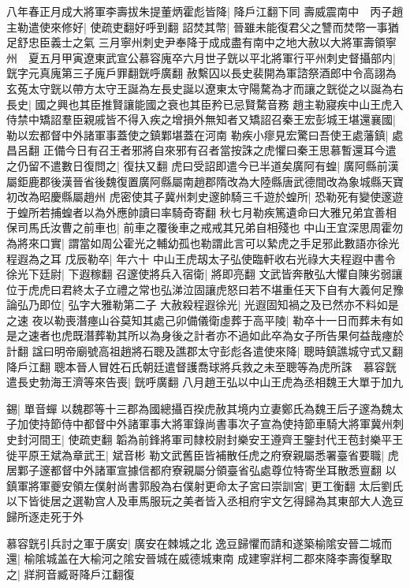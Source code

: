 八年春正月成大將軍李壽拔朱提董炳霍彪皆降|{
	降戶江翻下同}
壽威震南中　丙子趙主勒遣使來修好|{
	使疏吏翻好呼到翻}
詔焚其幣|{
	晉雖未能復君父之讐而焚幣一事猶足舒忠臣義士之氣}
三月寧州刺史尹奉降于成成盡有南中之地大赦以大將軍壽領寧州　夏五月甲寅遼東武宣公慕容廆卒六月世子皝以平北將軍行平州刺史督攝部内|{
	皝字元真廆第三子廆戶罪翻皝呼廣翻}
赦繫囚以長史裴開為軍諮祭酒郎中令高詡為玄菟太守皝以帶方太守王誕為左長史誕以遼東太守陽騖為才而讓之皝從之以誕為右長史|{
	國之興也其臣推賢讓能國之衰也其臣矜已忌賢騖音務}
趙主勒寢疾中山王虎入侍禁中矯詔羣臣親戚皆不得入疾之增損外無知者又矯詔召秦王宏彭城王堪還襄國|{
	勒以宏都督中外諸軍事蓋使之鎮鄴堪蓋在河南}
勒疾小瘳見宏驚曰吾使王處藩鎮|{
	處昌呂翻}
正備今日有召王者邪將自來邪有召者當按誅之虎懼曰秦王思慕暫還耳今遣之仍留不遣數日復問之|{
	復扶又翻}
虎曰受詔即遣今已半道矣廣阿有蝗|{
	廣阿縣前漢屬鉅鹿郡後漢晉省後魏復置廣阿縣屬南趙郡隋改為大陸縣唐武德間改為象城縣天寶初改為昭慶縣屬趙州}
虎密使其子冀州刺史邃帥騎三千遊於蝗所|{
	恐勒死有變使邃遊于蝗所若捕蝗者以為外應帥讀曰率騎奇寄翻}
秋七月勒疾篤遺命曰大雅兄弟宜善相保司馬氏汝曹之前車也|{
	前車之覆後車之戒戒其兄弟自相殘也}
中山王宜深思周霍勿為將來口實|{
	謂當如周公霍光之輔幼孤也勒謂此言可以縶虎之手足邪此數語亦徐光程遐為之耳}
戊辰勒卒|{
	年六十}
中山王虎刼太子弘使臨軒收右光祿大夫程遐中書令徐光下廷尉|{
	下遐稼翻}
召邃使將兵入宿衛|{
	將即亮翻}
文武皆奔散弘大懼自陳劣弱讓位于虎虎曰君終太子立禮之常也弘涕泣固讓虎怒曰若不堪重任天下自有大義何足豫論弘乃即位|{
	弘字大雅勒第二子}
大赦殺程遐徐光|{
	光遐固知禍之及已然亦不料如是之速}
夜以勒喪潛瘞山谷莫知其處己卯備儀衛虛葬于高平陵|{
	勒卒十一日而葬未有如是之速者也虎既潛葬勒其所以為身後之計者亦不過如此卒為女子所告果何益哉瘞於計翻}
諡曰明帝廟號高祖趙將石聰及譙郡太守彭彪各遣使來降|{
	聰時鎮譙城守式又翻降戶江翻}
聰本晉人冒姓石氏朝廷遣督護喬球將兵救之未至聰等為虎所誅　慕容皝遣長史勃海王濟等來告喪|{
	皝呼廣翻}
八月趙王弘以中山王虎為丞相魏王大單于加九

錫|{
	單音蟬}
以魏郡等十三郡為國總攝百揆虎赦其境内立妻鄭氏為魏王后子邃為魏太子加使持節侍中都督中外諸軍事大將軍錄尚書事次子宣為使持節車騎大將軍冀州刺史封河間王|{
	使疏吏翻}
韜為前鋒將軍司隸校尉封樂安王遵齊王鑒封代王苞封樂平王徙平原王斌為章武王|{
	斌音彬}
勒文武舊臣皆補散任虎之府寮親屬悉署臺省要職|{
	虎居鄴子邃都督中外諸軍宣據信都府寮親屬分領臺省弘處尊位特寄坐耳散悉亶翻}
以鎮軍將軍夔安領左僕射尚書郭殷為右僕射更命太子宮曰崇訓宮|{
	更工衡翻}
太后劉氏以下皆徙居之選勒宫人及車馬服玩之美者皆入丞相府宇文乞得歸為其東部大人逸豆歸所逐走死于外

慕容皝引兵討之軍于廣安|{
	廣安在棘城之北}
逸豆歸懼而請和遂築榆隂安晉二城而還|{
	榆隂城盖在大榆河之隂安晉城在威德城東南}
成建寧牂柯二郡來降李壽復擊取之|{
	牂牁音臧哥降戶江翻復}


